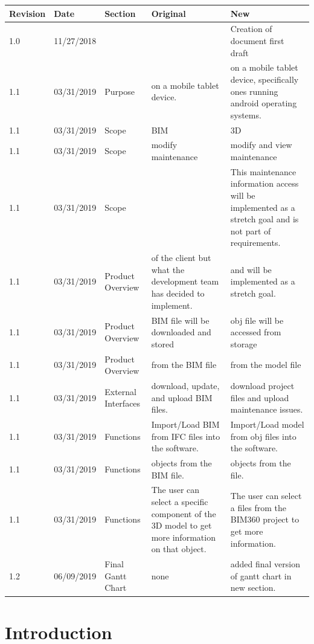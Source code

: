 \documentclass[onecolumn, draftclsnofoot,10pt, compsoc]{IEEEtran}
\begin{document}
\begin{tabular}{ p{2cm} p{2cm} p{2cm} p{} p{} }
 \textbf{Revision} & \textbf{Date} & \textbf{Section} & \textbf{Original} & \textbf{New} \\
 \hline
 1.0 & 11/27/2018 & & & Creation of document first draft \\
  \hline
 1.1 & 03/31/2019 & Purpose & on a mobile tablet device. & on a mobile tablet device, specifically ones running android operating systems. \\
  \hline
 1.1 & 03/31/2019 & Scope & BIM & 3D \\
   \hline
 1.1 & 03/31/2019 & Scope & modify maintenance & modify and view maintenance \\
 \hline
 1.1 & 03/31/2019 & Scope &  & This maintenance information access will be implemented as a
stretch goal and is not part of requirements. \\
 \hline
 1.1 & 03/31/2019 & Product Overview & of the client but what the development team has decided to implement. & and will be implemented as a stretch goal. \\
  \hline
 1.1 & 03/31/2019 & Product Overview & BIM file will be downloaded and stored & obj file will be accessed from storage \\
  \hline
 1.1 & 03/31/2019 & Product Overview & from the BIM file & from the model file \\
  \hline
 1.1 & 03/31/2019 & External Interfaces & download, update, and upload BIM files. & download project files and upload maintenance issues. \\
  \hline
 1.1 & 03/31/2019 & Functions & Import/Load BIM from IFC files into the software. & Import/Load model from obj files into the software. \\
  \hline
 1.1 & 03/31/2019 & Functions & objects from the BIM file. & objects from the file. \\
  \hline
 1.1 & 03/31/2019 & Functions & The user can select a specific component of the 3D model to get more information on that object. & The user can select a files from the BIM360 project to get more information. \\
 \hline
 1.2 & 06/09/2019 & Final Gantt Chart & none & added final version of gantt chart in new section.
\end{tabular}

\clearpage

\section{Introduction}
\end{document}
